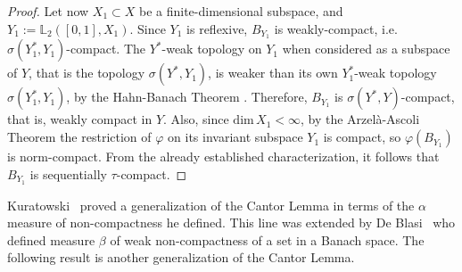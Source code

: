 \documentclass[12pt,leqno]{article}
\theoremstyle{definition}
\theoremstyle{remark}
\def\dim{\mathrm{dim\,}}
\def\L{\mathbb{L}}
\begin{document}
\begin{proof}
        Let now $X_1\subset X$ be a finite-dimensional subspace, and  $Y_1 := \L_2([0,1],X_1)$. Since $Y_1$ is reflexive, $B_{Y_1}$ is weakly-compact, i.e. $\sigma(Y_1^*,Y_1)$-compact. The $Y^*$-weak topology on $Y_1$ when considered as a subspace of $Y$, that is the topology $\sigma(Y^*,Y_1)$, is weaker than its own $Y_1^*$-weak topology $\sigma(Y_1^*,Y_1)$, by the Hahn-Banach Theorem \cite[Theorem~3.3]{rudin_functional}. Therefore, $B_{Y_1}$ is $\sigma(Y^*,Y)$-compact, that is, weakly compact in $Y$. Also, since $\dim X_1 < \infty$, by the Arzel\`a-Ascoli Theorem \cite[Theorem~A.5]{rudin_functional} the restriction of $\varphi$ on its invariant subspace $Y_1$ is compact, so $\varphi (B_{Y_1})$ is norm-compact. From the already established characterization, it follows that $B_{Y_1}$ is sequentially $\tau$-compact.
    \end{proof}

 Kuratowski~\cite{Kuratowski} proved a generalization of the Cantor Lemma in terms of the $\alpha$ measure of non-compactness he defined. This line was extended by De Blasi~\cite{De_Blasi} who defined measure $\beta$ of weak non-compactness of a set in a Banach space.   The following result is another generalization of  the Cantor Lemma.
\end{document}
